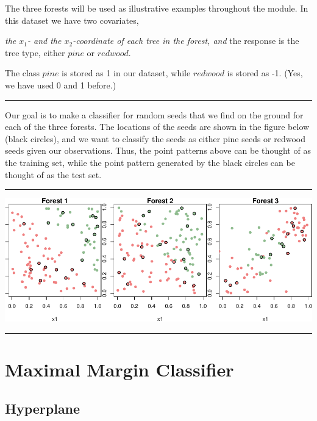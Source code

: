 \documentclass[]{article}
\begin{document}
The three forests will be used as illustrative examples throughout the
module. In this dataset we have two covariates,

\emph{the \(x_1\)- and the \(x_2\)-coordinate of each tree in the
forest, and } the response is the tree type, either \(pine\) or
\(redwood\).

The class \(pine\) is stored as 1 in our dataset, while \(redwood\) is
stored as -1. (Yes, we have used 0 and 1 before.)

\begin{center}\rule{0.5\linewidth}{\linethickness}\end{center}

Our goal is to make a classifier for random seeds that we find on the
ground for each of the three forests. The locations of the seeds are
shown in the figure below (black circles), and we want to classify the
seeds as either pine seeds or redwood seeds given our observations.
Thus, the point patterns above can be thought of as the training set,
while the point pattern generated by the black circles can be thought of
as the test set.

\begin{center}\rule{0.5\linewidth}{\linethickness}\end{center}

\includegraphics{9SVM_files/figure-latex/unnamed-chunk-5-1.pdf}

\begin{center}\rule{0.5\linewidth}{\linethickness}\end{center}

\hypertarget{maximal-margin-classifier}{%
\section{Maximal Margin Classifier}\label{maximal-margin-classifier}}

\hypertarget{hyperplane}{%
\subsection{Hyperplane}\label{hyperplane}}
\end{document}
